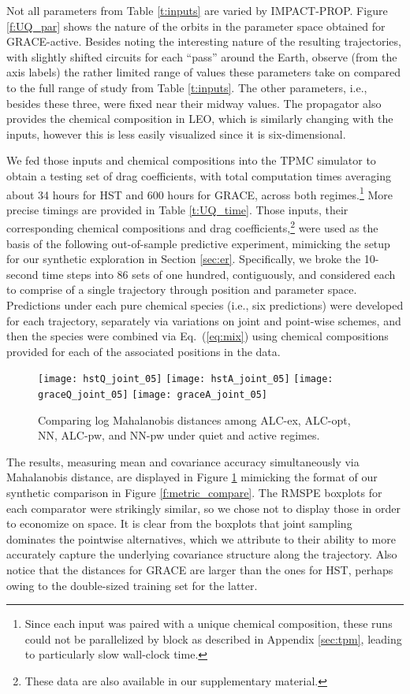 \documentclass[12pt]{article}
\begin{document}
Not all parameters from Table \ref{t:inputs} are varied by IMPACT-PROP. Figure \ref{f:UQ_par} 
shows the nature of the orbits in the parameter space obtained for GRACE-active.  
Besides noting the interesting nature of the resulting trajectories, with slightly 
shifted circuits for each ``pass'' around the Earth, observe (from the axis labels) 
the rather limited range of values these parameters take on compared to the full 
range of study from Table \ref{t:inputs}.  The other parameters, i.e., besides these 
three, were fixed near their midway values. The propagator also provides the chemical
composition in LEO, which is similarly changing with the inputs, however this is 
less easily visualized since it is six-dimensional.

We fed those inputs and chemical compositions into the TPMC simulator to
obtain a testing set of drag coefficients, with total computation times averaging
about 34 hours for HST and 600 hours for GRACE, across both
regimes.\footnote{Since each input was paired with a unique chemical
composition, these runs could not be parallelized by block as described in
Appendix \ref{sec:tpm}, leading to particularly slow wall-clock time.} More
precise timings are provided in Table \ref{t:UQ_time}.  Those inputs, their
corresponding chemical compositions and drag coefficients,\footnote{These data
are also available in our supplementary material.} were used as the basis of
the following out-of-sample predictive experiment, mimicking the setup for our
synthetic exploration in Section \ref{sec:er}. Specifically, we broke the
10-second time steps into 86 sets of one hundred, contiguously, and
considered each to comprise of a single trajectory through position and
parameter space. Predictions under each pure chemical species (i.e., six
predictions) were developed for each trajectory, separately via variations on
joint and point-wise schemes, and then the species were combined via
Eq.~(\ref{eq:mix}) using chemical compositions provided for each of the
associated positions in the data.
\begin{figure}[ht!]
\centering
\texttt{[image: hstQ\_joint\_05]}
\texttt{[image: hstA\_joint\_05]}
\texttt{[image: graceQ\_joint\_05]}
\texttt{[image: graceA\_joint\_05]}
\caption{Comparing log Mahalanobis distances among ALC-ex, ALC-opt, NN, ALC-pw, 
and NN-pw under quiet and active regimes.}
\label{f:UQ_traj}
\end{figure}
The results, measuring mean and covariance accuracy simultaneously via
Mahalanobis distance, are displayed in Figure \ref{f:UQ_traj} mimicking the
format of our synthetic comparison in Figure \ref{f:metric_compare}.  The RMSPE
boxplots for each comparator were strikingly similar, so we chose not to
display those in order to economize on space.  It is clear from the boxplots
that joint sampling dominates the pointwise alternatives, which we attribute
to their ability to more accurately capture the underlying covariance
structure along the trajectory.   Also notice that the distances for GRACE are
larger than the ones for HST, perhaps owing to the double-sized training set
for the latter.
\end{document}

